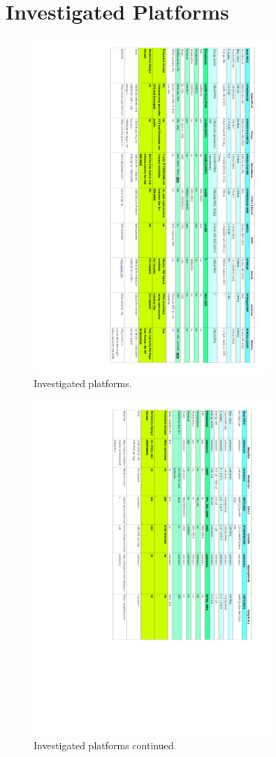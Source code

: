 \documentclass[journal,comsoc]{IEEEtran}
\begin{document}
\newpage
\section{Investigated Platforms}
\label{sec:appendixplatforms}
\begin{figure}[h!]
\centering
\includegraphics[width=0.8\textwidth]{Figures/summary01r}
\caption{Investigated platforms.}
\end{figure}
\begin{figure}[h!]
\centering
\includegraphics[width=0.8\textwidth]{Figures/summary02r}
\caption{Investigated platforms continued.}
\end{figure}


\ifCLASSOPTIONcaptionsoff
  \newpage
\fi
\end{document}
